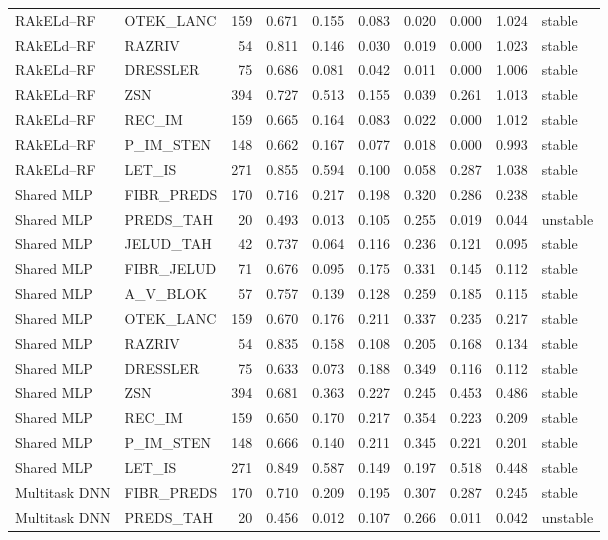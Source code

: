 \begin{longtable}{llrrrrrrrl}
RAkELd--RF & OTEK\_LANC & 159 & 0.671 & 0.155 & 0.083 & 0.020 & 0.000 & 1.024 & stable \\
RAkELd--RF & RAZRIV & 54 & 0.811 & 0.146 & 0.030 & 0.019 & 0.000 & 1.023 & stable \\
RAkELd--RF & DRESSLER & 75 & 0.686 & 0.081 & 0.042 & 0.011 & 0.000 & 1.006 & stable \\
RAkELd--RF & ZSN & 394 & 0.727 & 0.513 & 0.155 & 0.039 & 0.261 & 1.013 & stable \\
RAkELd--RF & REC\_IM & 159 & 0.665 & 0.164 & 0.083 & 0.022 & 0.000 & 1.012 & stable \\
RAkELd--RF & P\_IM\_STEN & 148 & 0.662 & 0.167 & 0.077 & 0.018 & 0.000 & 0.993 & stable \\
RAkELd--RF & LET\_IS & 271 & 0.855 & 0.594 & 0.100 & 0.058 & 0.287 & 1.038 & stable \\
Shared MLP & FIBR\_PREDS & 170 & 0.716 & 0.217 & 0.198 & 0.320 & 0.286 & 0.238 & stable \\
Shared MLP & PREDS\_TAH & 20 & 0.493 & 0.013 & 0.105 & 0.255 & 0.019 & 0.044 & unstable \\
Shared MLP & JELUD\_TAH & 42 & 0.737 & 0.064 & 0.116 & 0.236 & 0.121 & 0.095 & stable \\
Shared MLP & FIBR\_JELUD & 71 & 0.676 & 0.095 & 0.175 & 0.331 & 0.145 & 0.112 & stable \\
Shared MLP & A\_V\_BLOK & 57 & 0.757 & 0.139 & 0.128 & 0.259 & 0.185 & 0.115 & stable \\
Shared MLP & OTEK\_LANC & 159 & 0.670 & 0.176 & 0.211 & 0.337 & 0.235 & 0.217 & stable \\
Shared MLP & RAZRIV & 54 & 0.835 & 0.158 & 0.108 & 0.205 & 0.168 & 0.134 & stable \\
Shared MLP & DRESSLER & 75 & 0.633 & 0.073 & 0.188 & 0.349 & 0.116 & 0.112 & stable \\
Shared MLP & ZSN & 394 & 0.681 & 0.363 & 0.227 & 0.245 & 0.453 & 0.486 & stable \\
Shared MLP & REC\_IM & 159 & 0.650 & 0.170 & 0.217 & 0.354 & 0.223 & 0.209 & stable \\
Shared MLP & P\_IM\_STEN & 148 & 0.666 & 0.140 & 0.211 & 0.345 & 0.221 & 0.201 & stable \\
Shared MLP & LET\_IS & 271 & 0.849 & 0.587 & 0.149 & 0.197 & 0.518 & 0.448 & stable \\
Multitask DNN & FIBR\_PREDS & 170 & 0.710 & 0.209 & 0.195 & 0.307 & 0.287 & 0.245 & stable \\
Multitask DNN & PREDS\_TAH & 20 & 0.456 & 0.012 & 0.107 & 0.266 & 0.011 & 0.042 & unstable \\

\end{longtable}
